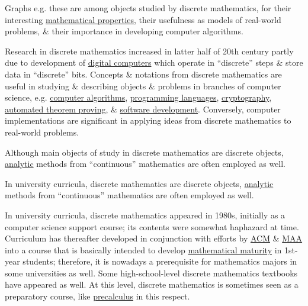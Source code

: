 \documentclass{article}
\begin{document}
{\sf Graphs e.g. these are among objects studied by discrete mathematics, for their interesting \href{https://en.wikipedia.org/wiki/Graph_property}{mathematical properties}, their usefulness as models of real-world problems, \& their importance in developing computer algorithms.}

Research in discrete mathematics increased in latter half of 20th century partly due to development of \href{https://en.wikipedia.org/wiki/Digital_computers}{digital computers} which operate in ``discrete'' steps \& store data in ``discrete'' bits. Concepts \& notations from discrete mathematics are useful in studying \& describing objects \& problems in branches of computer science, e.g. \href{https://en.wikipedia.org/wiki/Computer_algorithm}{computer algorithms}, \href{https://en.wikipedia.org/wiki/Programming_language}{programming languages}, \href{https://en.wikipedia.org/wiki/Cryptography}{cryptography}, \href{https://en.wikipedia.org/wiki/Automated_theorem_proving}{automated theorem proving}, \& \href{https://en.wikipedia.org/wiki/Software_development}{software development}. Conversely, computer implementations are significant in applying ideas from discrete mathematics to real-world problems.

Although main objects of study in discrete mathematics are discrete objects, \href{https://en.wikipedia.org/wiki/Analysis_(mathematics)}{analytic} methods from ``continuous'' mathematics are often employed as well.

In university curricula, discrete mathematics are discrete objects, \href{https://en.wikipedia.org/wiki/Analysis_(mathematics)}{analytic} methods from ``continuous'' mathematics are often employed as well.

In university curricula, discrete mathematics appeared in 1980s, initially as a computer science support course; its contents were somewhat haphazard at time. Curriculum has thereafter developed in conjunction with efforts by \href{https://en.wikipedia.org/wiki/Association_for_Computing_Machinery}{ACM} \& \href{https://en.wikipedia.org/wiki/Mathematical_Association_of_America}{MAA} into a course that is basically intended to develop \href{https://en.wikipedia.org/wiki/Mathematical_maturity}{mathematical maturity} in 1st-year students; therefore, it is nowadays a prerequisite for mathematics majors in some universities as well. Some high-school-level discrete mathematics textbooks have appeared as well. At this level, discrete mathematics is sometimes seen as a preparatory course, like \href{https://en.wikipedia.org/wiki/Precalculus}{precalculus} in this respect.
\end{document}
